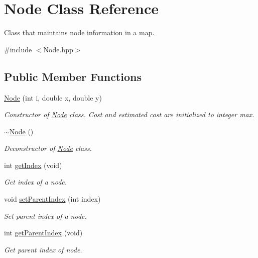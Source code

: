 \hypertarget{classNode}{\section{Node Class Reference}
\label{classNode}
}


Class that maintains node information in a map.  




{\ttfamily \#include $<$Node.\-hpp$>$}

\subsection*{Public Member Functions}
\begin{DoxyCompactItemize}
\item 
\hyperlink{classNode_a19c49d23eaab8d8d514c758598bc8570}{Node} (int i, double x, double y)
\begin{DoxyCompactList}\small\item\em Constructor of \hyperlink{classNode}{Node} class. Cost and estimated cost are initialized to integer max. \end{DoxyCompactList}\item 
\hyperlink{classNode_aa0840c3cb5c7159be6d992adecd2097c}{$\sim$\-Node} ()
\begin{DoxyCompactList}\small\item\em Deconstructor of \hyperlink{classNode}{Node} class. \end{DoxyCompactList}\item 
int \hyperlink{classNode_af157df6ef5c45d7ce978e9c7371c297e}{get\-Index} (void)
\begin{DoxyCompactList}\small\item\em Get index of a node. \end{DoxyCompactList}\item 
void \hyperlink{classNode_aa7e882fae3b07f7add46f3315c9e7e1b}{set\-Parent\-Index} (int index)
\begin{DoxyCompactList}\small\item\em Set parent index of a node. \end{DoxyCompactList}\item 
int \hyperlink{classNode_a38525d55d0f15d4b6be0b3b8ed150441}{get\-Parent\-Index} (void)
\begin{DoxyCompactList}\small\item\em Get parent index of node. \end{DoxyCompactList}\item 

\end{DoxyCompactItemize}

